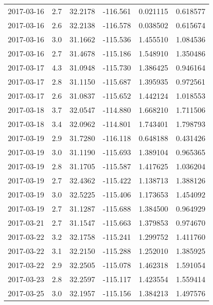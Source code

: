\begin{tabular}{lrrrrr}
2017-03-16 &       2.7 &  32.2178 &  -116.561 &         0.021115 &         0.618577 \\
2017-03-16 &       2.6 &  32.2138 &  -116.578 &         0.038502 &         0.615674 \\
2017-03-16 &       3.0 &  31.1662 &  -115.536 &         1.455510 &         1.084536 \\
2017-03-16 &       2.7 &  31.4678 &  -115.186 &         1.548910 &         1.350486 \\
2017-03-17 &       4.3 &  31.0948 &  -115.730 &         1.386425 &         0.946164 \\
2017-03-17 &       2.8 &  31.1150 &  -115.687 &         1.395935 &         0.972561 \\
2017-03-17 &       2.6 &  31.0837 &  -115.652 &         1.442124 &         1.018553 \\
2017-03-18 &       3.7 &  32.0547 &  -114.880 &         1.668210 &         1.711506 \\
2017-03-18 &       3.4 &  32.0962 &  -114.801 &         1.743401 &         1.798793 \\
2017-03-19 &       2.9 &  31.7280 &  -116.118 &         0.648188 &         0.431426 \\
2017-03-19 &       3.0 &  31.1190 &  -115.693 &         1.389104 &         0.965365 \\
2017-03-19 &       2.8 &  31.1705 &  -115.587 &         1.417625 &         1.036204 \\
2017-03-19 &       2.7 &  32.4362 &  -115.422 &         1.138713 &         1.388126 \\
2017-03-19 &       3.0 &  32.5225 &  -115.406 &         1.173653 &         1.454092 \\
2017-03-19 &       2.7 &  31.1287 &  -115.688 &         1.384500 &         0.964929 \\
2017-03-21 &       2.7 &  31.1547 &  -115.663 &         1.379853 &         0.974670 \\
2017-03-22 &       3.2 &  32.1758 &  -115.241 &         1.299752 &         1.411760 \\
2017-03-22 &       3.1 &  32.2150 &  -115.288 &         1.252010 &         1.385925 \\
2017-03-22 &       2.9 &  32.2505 &  -115.078 &         1.462318 &         1.591054 \\
2017-03-23 &       2.8 &  32.2597 &  -115.117 &         1.423554 &         1.559414 \\
2017-03-25 &       3.0 &  32.1957 &  -115.156 &         1.384213 &         1.497576 \\

\end{tabular}
